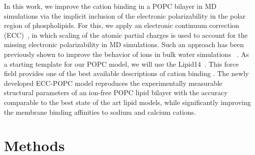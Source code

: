 \documentclass[aip,jcp,twocolumn]{revtex4}
\begin{document}


In this work, we improve the cation binding in a POPC bilayer in MD simulations 
via the implicit inclusion of the electronic polarizability in the polar region of phospholipids. 
For this, we apply an electronic continuum correction (ECC)~\cite{leontyev11}, 
in which scaling of the atomic partial charges is used to account for the missing electronic polarizability in MD simulations. 
Such an approach has been previously shown to improve the behavior of ions in bulk water simulations ~\cite{martinek17, Pluharova2014, kohagen14, kohagen16}. As a starting template for our POPC model, we will use the Lipid14~\cite{dickson14}. This force field provides one of the best available descriptions of cation binding \cite{catte16}. 
The newly developed ECC-POPC model reproduces the experimentally
measurable structural parameters of an ion-free POPC lipid bilayer with the accuracy comparable to the best state of the art lipid models, while significantly improving the membrane binding affinities to sodium and calcium cations.



\section{Methods}
\end{document}
